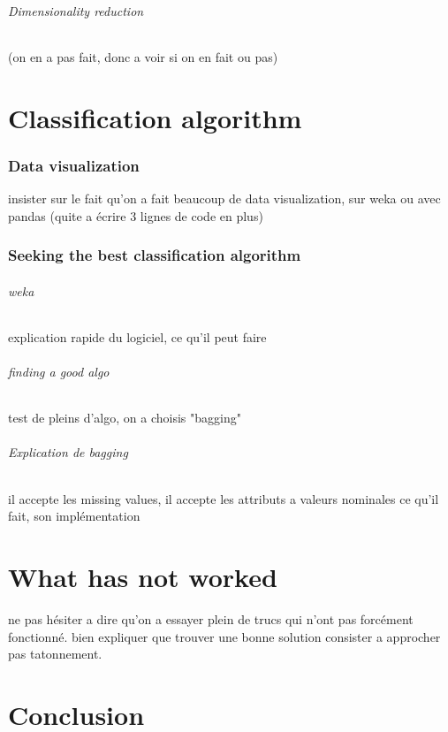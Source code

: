 \documentclass[11pt,a4paper,portrait]{article}
\begin{document}
\paragraph{Dimensionality reduction}
(on en a pas fait, donc a voir si on en fait ou pas)

\part{Classification algorithm}
\setcounter{section}{0}

\section{Data visualization}
insister sur le fait qu'on a fait beaucoup de data visualization, sur weka ou avec pandas (quite a écrire 3 lignes de code en plus)

\section{Seeking the best classification algorithm}

\paragraph{weka}
explication rapide du logiciel, ce qu'il peut faire

\paragraph{finding a good algo}
test de pleins d'algo, on a choisis "bagging"

\paragraph{Explication de bagging}
il accepte les missing values,
il accepte les attributs a valeurs nominales
ce qu'il fait,
son implémentation


\part{What has not worked}
\setcounter{section}{0}

ne pas hésiter a dire qu'on a essayer plein de trucs qui n'ont pas forcément fonctionné. bien expliquer que trouver une bonne solution consister a approcher pas tatonnement.


\part*{Conclusion}
\end{document}
